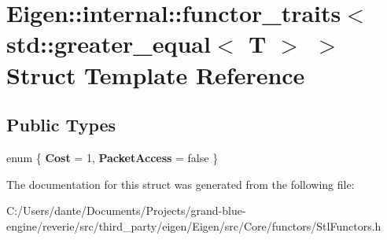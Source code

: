 \hypertarget{struct_eigen_1_1internal_1_1functor__traits_3_01std_1_1greater__equal_3_01_t_01_4_01_4}{}\section{Eigen\+::internal\+::functor\+\_\+traits$<$ std\+::greater\+\_\+equal$<$ T $>$ $>$ Struct Template Reference}
\label{struct_eigen_1_1internal_1_1functor__traits_3_01std_1_1greater__equal_3_01_t_01_4_01_4}
\subsection*{Public Types}
\begin{DoxyCompactItemize}
\item 
\mbox{\label{struct_eigen_1_1internal_1_1functor__traits_3_01std_1_1greater__equal_3_01_t_01_4_01_4_a49cdbf04b1f0a5fa28b6b438ab74ce22}} 
enum \{ {\bfseries Cost} = 1, 
{\bfseries Packet\+Access} = false
 \}
\end{DoxyCompactItemize}


The documentation for this struct was generated from the following file\+:\begin{DoxyCompactItemize}
\item 
C\+:/\+Users/dante/\+Documents/\+Projects/grand-\/blue-\/engine/reverie/src/third\+\_\+party/eigen/\+Eigen/src/\+Core/functors/Stl\+Functors.\+h\end{DoxyCompactItemize}
